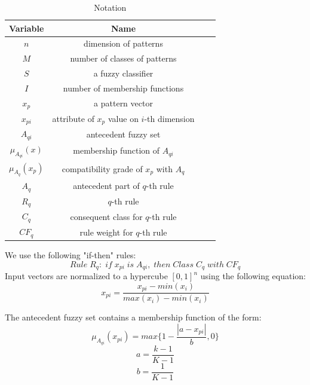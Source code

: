 \documentclass[conference]{IEEEtran}
\begin{document}
  \begin{table}[H]
    
    \centering
      \begin{tabular}{cccc}
      \toprule
      Variable&Name\\
      \midrule
      $n$&dimension of patterns\\
      $M$&number of classes of patterns\\
      $S$&a fuzzy classifier\\
      $I$&number of membership functions\\
      $x_p$&a pattern vector\\
      $x_{pi}$&attribute of $x_p$ value on $i$-th dimension\\
      $A_{qi}$&antecedent fuzzy set\\
      $\mu_{A_{qi}}(x)$&membership function of $A_{qi}$\\
      $\mu_{A_{q}}(x_p)$&compatibility grade of $x_p$ with $A_q$\\
      $A_q$&antecedent part of $q$-th rule\\
      
      $R_q$&$q$-th rule\\
      $C_q$&consequent class for $q$-th rule\\
      $CF_q$&rule weight for $q$-th rule\\
  \bottomrule
  \end{tabular}
  \caption{Notation}
  \label{table:1}
  \end{table}
    We use the following "if-then" rules:
\begin{equation}
Rule\;R_q:\;if\;x_{pi}\;is\;A_{qi},\;then\;Class\;C_q\;with\;CF_q
\end{equation}  
Input vectors are normalized to a hypercube $[0,1]^n$ using the following equation:
\begin{equation}x_{pi}=\frac{x_{pi}-min(x_{i})}{max(x_{i})-min(x_{i})}\end{equation}

  The antecedent fuzzy set contains a membership function of the form:
  \begin{equation}
    \mu_{A_{qi}}(x_{pi}) =max\{1-\frac{|a-x_{pi}|}
  {b},0\}
  \end{equation}
  \begin{equation}
    a=\frac{k-1}{K-1}
  \end{equation}
  \begin{equation}
  b=\frac{1}{K-1}
  \end{equation}
  
\end{document}
